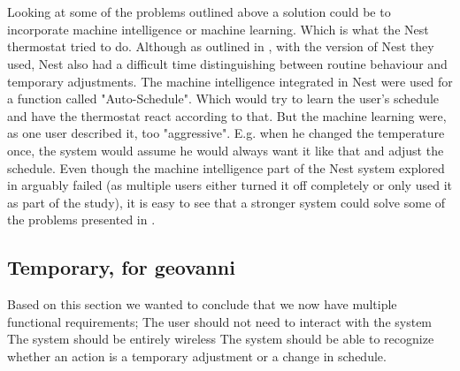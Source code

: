 \\\\
Looking at some of the problems outlined above a solution could be to incorporate machine intelligence or machine learning. Which is what the Nest thermostat\cite{AdaptiveInterviews} tried to do. Although as outlined in \cite{AdaptiveInterviews}, with the version of Nest they used, Nest also had a difficult time distinguishing between routine behaviour and temporary adjustments. The machine intelligence integrated in Nest were used for a function called "Auto-Schedule". Which would try to learn the user's schedule and have the thermostat react according to that. But the machine learning were, as one user described it\cite{AdaptiveInterviews}, too "aggressive". E.g. when he changed the temperature once, the system would assume he would always want it like that and adjust the schedule.
Even though the machine intelligence part of the Nest system explored in \cite{AdaptiveInterviews} arguably failed (as multiple users either turned it off completely or only used it as part of the study), it is easy to see that a stronger system could solve some of the problems presented in \cite{HAInterviews}. 
\subsection{Temporary, for geovanni}
Based on this section we wanted to conclude that we now have multiple functional requirements;
The user should not need to interact with the system
The system should be entirely wireless
The system should be able to recognize whether an action is a temporary adjustment or a change in schedule.
